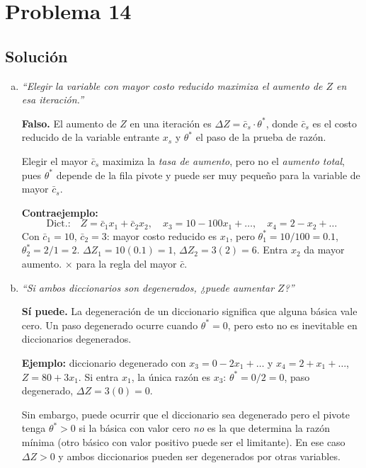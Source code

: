 \documentclass{article}
\begin{document}
\newpage
\section*{Problema 14}

\subsection*{Solución}

\begin{enumerate}[a)]

\item \textit{``Elegir la variable con mayor costo reducido maximiza el aumento de $Z$ en esa iteración.''}

\textbf{Falso.} El aumento de $Z$ en una iteración es $\Delta Z=\bar{c}_s\cdot\theta^*$, donde $\bar{c}_s$ es el costo reducido de la variable entrante $x_s$ y $\theta^*$ el paso de la prueba de razón.

Elegir el mayor $\bar{c}_s$ maximiza la \emph{tasa de aumento}, pero no el \emph{aumento total}, pues $\theta^*$ depende de la fila pivote y puede ser muy pequeño para la variable de mayor $\bar{c}_s$.

\textbf{Contraejemplo:}
$$\text{Dict.:}\quad Z=\bar{c}_1 x_1+\bar{c}_2 x_2,\quad x_3=10-100x_1+\ldots,\quad x_4=2-x_2+\ldots$$
Con $\bar{c}_1=10$, $\bar{c}_2=3$: mayor costo reducido es $x_1$, pero $\theta_1^*=10/100=0.1$, $\theta_2^*=2/1=2$.
$\Delta Z_1=10(0.1)=1$, $\Delta Z_2=3(2)=6$. Entra $x_2$ da mayor aumento. $\times$ para la regla del mayor $\bar{c}$.

\item \textit{``Si ambos diccionarios son degenerados, ¿puede aumentar $Z$?''}

\textbf{Sí puede.} La degeneración de un diccionario significa que alguna básica vale cero. Un paso degenerado ocurre cuando $\theta^*=0$, pero esto no es inevitable en diccionarios degenerados.

\textbf{Ejemplo:} diccionario degenerado con $x_3=0-2x_1+\ldots$ y $x_4=2+x_1+\ldots$, $Z=80+3x_1$. Si entra $x_1$, la única razón es $x_3$: $\theta^*=0/2=0$, paso degenerado, $\Delta Z=3(0)=0$.

Sin embargo, puede ocurrir que el diccionario sea degenerado pero el pivote tenga $\theta^*>0$ si la básica con valor cero \emph{no} es la que determina la razón mínima (otro básico con valor positivo puede ser el limitante). En ese caso $\Delta Z>0$ y ambos diccionarios pueden ser degenerados por otras variables.


\end{enumerate}
\end{document}
